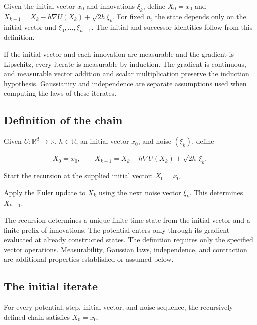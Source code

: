 \documentclass[11pt,a4paper]{report}
\begin{document}
Given the initial vector \(x_0\) and innovations \(\xi_k\), define \(X_0=x_0\) and \(X_{k+1}=X_k-h\nabla U(X_k)+\sqrt{2h}\xi_k\). For fixed \(n\), the state depends only on the initial vector and \(\xi_0,\ldots,\xi_{n-1}\). The initial and successor identities follow from this definition.



If the initial vector and each innovation are measurable and the gradient is Lipschitz, every iterate is measurable by induction. The gradient is continuous, and measurable vector addition and scalar multiplication preserve the induction hypothesis. Gaussianity and independence are separate assumptions used when computing the laws of these iterates.

\subsection{\texorpdfstring{Definition of the chain}{Definition of the chain}}
\label{report-step-UnadjustedLangevin-Dynamics-lean-1}


Given \(U:\mathbb R^d\to\mathbb R\), \(h\in\mathbb R\), an initial vector \(x_0\), and noise \((\xi_k)\), define

\[X_0=x_0,\qquad X_{k+1}=X_k-h\nabla U(X_k)+\sqrt{2h}\,\xi_k.\]

Start the recursion at the supplied initial vector: \(X_0=x_0\).



Apply the Euler update to \(X_k\) using the next noise vector \(\xi_k\). This determines \(X_{k+1}\).



The recursion determines a unique finite-time state from the initial vector and a finite prefix of innovations. The potential enters only through its gradient evaluated at already constructed states. The definition requires only the specified vector operations. Measurability, Gaussian laws, independence, and contraction are additional properties established or assumed below.

\subsection{\texorpdfstring{The initial iterate}{The initial iterate}}
\label{report-step-UnadjustedLangevin-Dynamics-lean-2}


For every potential, step, initial vector, and noise sequence, the recursively defined chain satisfies \(X_0=x_0\).
\end{document}
